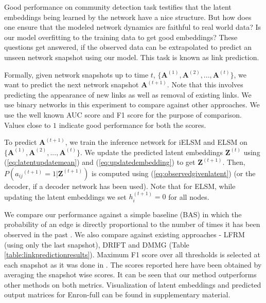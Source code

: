 \documentclass[letterpaper]{article} %
\begin{document}
Good performance on community detection task testifies that the latent embeddings being learned by the network have a nice structure. But how does one ensure that the modeled network dynamics are faithful to real world data? Is our model overfitting to the training data to get good embeddings? These questions get answered, if the observed data can be extrapolated to predict an unseen network snapshot using our model. This task is known as link prediction.

Formally, given network snapshots up to time ${t}$, $\{\mathbf{A}^{(1)}, \mathbf{A}^{(2)}, ..., \mathbf{A}^{(t)}\}$, we want to predict the next network snapshot $\mathbf{A}^{(t+1)}$. Note that this involves predicting the appearance of new links as well as removal of existing links. We use binary networks in this experiment to compare against other approaches. We use the well known AUC score and F1 score for the purpose of  comparison. Values close to $1$ indicate good performance for both the scores.

To predict $\mathbf{A}^{(t+1)}$, we train the inference network for iELSM and ELSM on $\{\mathbf{A}^{(1)}, \mathbf{A}^{(2)}, ..., \mathbf{A}^{(t)}\}$. We update the predicted latent embeddings $\mathbf{Z}^{(t)}$ using (\ref{eq:latentupdatemean}) and (\ref{eq:updatedembedding}) to get  $\mathbf{Z}^{(t + 1)}$. Then, $P({a_{ij}}^{(t+1)} = 1 | \mathbf{Z}^{(t + 1)})$ is computed using (\ref{eq:observedgivenlatent}) (or the decoder, if a decoder network has been used). Note that for ELSM, while updating the latent embeddings we set $h_i^{(t+1)} = 0$ for all nodes.

We compare our performance against a simple baseline (BAS) in which the probability of an edge is directly proportional to the number of times it has been observed in the past \cite{FouldsEtAl:2011:ADynamicRelationalInfiniteFeatureModelForLongitudinalSocialNetworks}. We also compare against existing approaches - LFRM \cite{MillerEtAl:2009:NonparametricLatentFeatureModelsForLinkPrediction} (using only the last snapshot), DRIFT \cite{FouldsEtAl:2011:ADynamicRelationalInfiniteFeatureModelForLongitudinalSocialNetworks} and DMMG \cite{KimEtAl:2013:NonparametricMultiGroupMembershipModelForDynamicNetworks} (Table \ref{table:linkpredictionresults}). Maximum F1 score over all thresholds is selected at each snapshot as it was done in \cite{KimEtAl:2013:NonparametricMultiGroupMembershipModelForDynamicNetworks}. The scores reported here have been obtained by averaging the snapshot wise scores. It can be seen that our method outperforms other methods on both metrics. Visualization of latent embeddings and predicted output matrices for Enron-full can be found in supplementary material.
\end{document}
